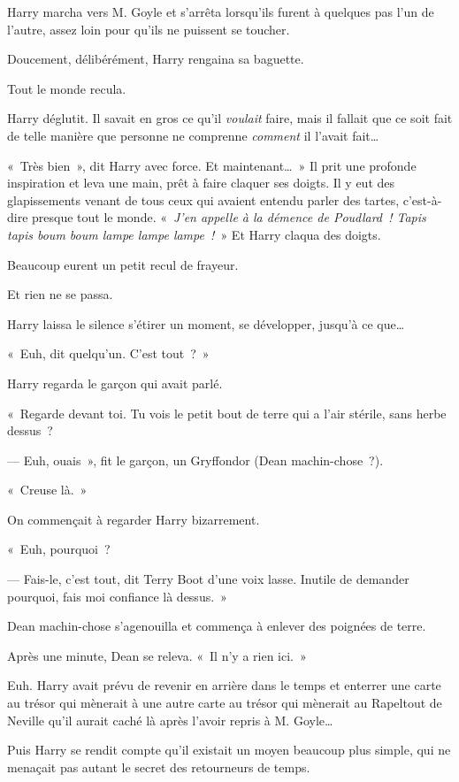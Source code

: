 Harry marcha vers M. Goyle et s'arrêta lorsqu'ils furent à quelques pas l'un de l'autre, assez loin pour qu'ils ne puissent se toucher.

Doucement, délibérément, Harry rengaina sa baguette.

Tout le monde recula.

Harry déglutit. Il savait en gros ce qu'il \emph{voulait} faire, mais il fallait que ce soit fait de telle manière que personne ne comprenne \emph{comment} il l'avait fait…

«~Très bien~», dit Harry avec force. Et maintenant…~»
Il prit une profonde inspiration et leva une main, prêt à faire claquer ses doigts.
Il y eut des glapissements venant de tous ceux qui avaient entendu parler des tartes, c'est-à-dire presque tout le monde.
«~\emph{J'en appelle à la démence de Poudlard~!
Tapis tapis boum boum lampe lampe lampe~!}~»
Et Harry claqua des doigts.

Beaucoup eurent un petit recul de frayeur.

Et rien ne se passa.

Harry laissa le silence s'étirer un moment, se développer, jusqu'à ce que…

«~Euh, dit quelqu'un. C'est tout~?~»

Harry regarda le garçon qui avait parlé.

«~Regarde devant toi. Tu vois le petit bout de terre qui a l'air stérile, sans herbe dessus~?

--- Euh, ouais~», fit le garçon, un Gryffondor (Dean machin-chose~?).

«~Creuse là.~»

On commençait à regarder Harry bizarrement.

«~Euh, pourquoi~?

--- Fais-le, c'est tout, dit Terry Boot d'une voix lasse.
Inutile de demander pourquoi, fais moi confiance là dessus.~»

Dean machin-chose s'agenouilla et commença à enlever des poignées de terre.

Après une minute, Dean se releva. «~Il n'y a rien ici.~»

Euh. Harry avait prévu de revenir en arrière dans le temps et enterrer une carte au trésor qui mènerait à une autre carte au trésor qui mènerait au Rapeltout de Neville qu'il aurait caché là après l'avoir repris à M. Goyle…

Puis Harry se rendit compte qu'il existait un moyen beaucoup plus simple, qui ne menaçait pas autant le secret des retourneurs de temps.

